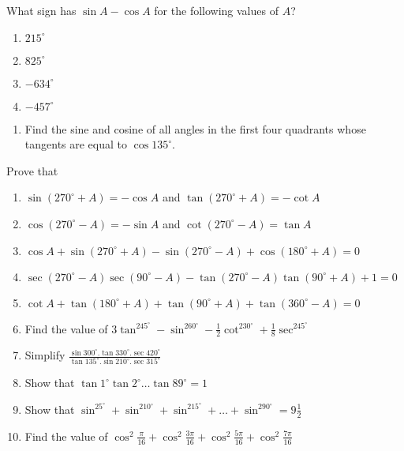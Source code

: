 What sign has $\sin A - \cos A$ for the following values of $A$?
\begin{enumerate}[resume]
\item $215^\circ$
\item $825^\circ$
\item $-634^\circ$
\item $-457^\circ$
\end{enumerate}

\begin{enumerate}[resume]
\item Find the sine and cosine of all angles in the first four quadrants whose tangents are equal to $\cos 135^\circ.$
\end{enumerate}

Prove that
\begin{enumerate}[resume]
\item $\sin(270^\circ + A) = -\cos A$ and $\tan(270^\circ + A) = -\cot A$
\item $\cos(270^\circ - A) = -\sin A$ and $\cot(270^\circ - A) = \tan A$
\item $\cos A + \sin(270^\circ + A) - \sin(270^\circ - A) + \cos(180^\circ + A) = 0$
\item $\sec(270^\circ - A)\sec(90^\circ - A) - \tan(270^\circ - A)\tan(90^\circ + A) + 1 = 0$
\item $\cot A + \tan(180^\circ + A) + \tan(90^\circ + A) + \tan(360^\circ - A) = 0$
\item Find the value of $3\tan^245^\circ - \sin^260^\circ - \frac{1}{2}\cot^230^\circ + \frac{1}{8}\sec^245^\circ$
\item  Simplify $\frac{\sin 300^\circ.\tan 330^\circ.\sec 420^\circ}{\tan 135^\circ.\sin 210^\circ.\sec 315^\circ}$
\item Show that $\tan 1^\circ\tan 2^\circ \ldots \tan 89^\circ = 1$
\item Show that $\sin^25^\circ + \sin^210^\circ + \sin^215^\circ + \ldots + \sin^290^\circ = 9\frac{1}{2}$
\item Find the value of $\cos^2\frac{\pi}{16} + \cos^2\frac{3\pi}{16} + \cos^2\frac{5\pi}{16} + \cos^2\frac{7\pi}{16}$
\end{enumerate}


